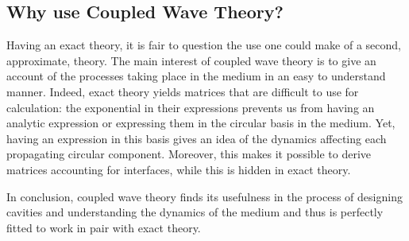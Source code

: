\subsection{Why use Coupled Wave Theory?}
Having an exact theory, it is fair to question the use one could make of a second, approximate, theory. The main interest of coupled wave theory is to give an account of the processes taking place in the medium in an easy to understand manner. Indeed, exact theory yields matrices that are difficult to use for calculation: the exponential in their expressions prevents us from having an analytic expression or expressing them in the circular basis in the medium. Yet, having an expression in this basis gives an idea of the dynamics affecting each propagating circular component. Moreover, this makes it possible to derive matrices accounting for interfaces, while this is hidden in exact theory.

In conclusion, coupled wave theory finds its usefulness in the process of designing cavities and understanding the dynamics of the medium and thus is perfectly fitted to work in pair with exact theory.